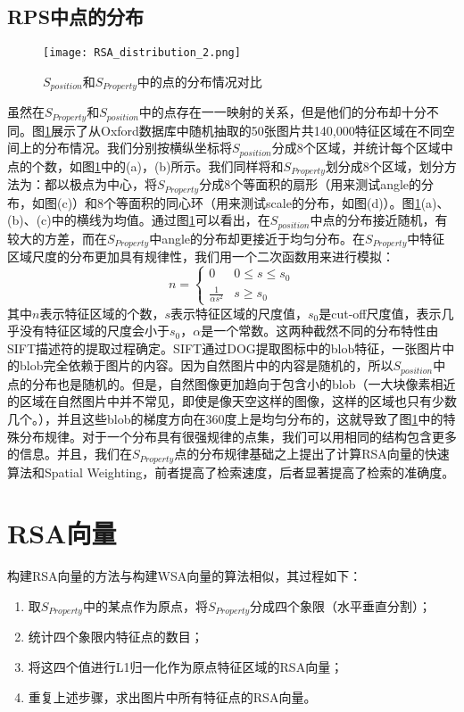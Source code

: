 \subsection{RPS中点的分布}
\begin{figure}[h]
	\centering
	\texttt{[image: RSA\_distribution\_2.png]}
	\caption{$S_{position}$和$S_{Property}$中的点的分布情况对比}\label{fig:RSA_dis_2}
\end{figure}
虽然在$S_{Property}$和$S_{position}$中的点存在一一映射的关系，但是他们的分布却十分不同。图\ref{fig:RSA_dis_2}展示了从Oxford\cite{philbin2007object}数据库中随机抽取的50张图片共140,000特征区域在不同空间上的分布情况。我们分别按横纵坐标将$S_{position}$分成8个区域，并统计每个区域中点的个数，如图\ref{fig:RSA_dis_2}中的(a)，(b)所示。我们同样将和$S_{Property}$划分成8个区域，划分方法为：都以极点为中心，将$S_{Property}$分成8个等面积的扇形（用来测试angle的分布，如图(c)）和8个等面积的同心环（用来测试scale的分布，如图(d)）。图\ref{fig:RSA_dis_2}(a)、(b)、(c)中的横线为均值。通过图\ref{fig:RSA_dis_2}可以看出，在$S_{position}$中点的分布接近随机，有较大的方差，而在$S_{Property}$中angle的分布却更接近于均匀分布。在$S_{Property}$中特征区域尺度的分布更加具有规律性，我们用一个二次函数用来进行模拟：
\begin{equation}\label{eq:scale}
n=
\begin{cases}
0 & \text{$0 \le s \le s_0$} \\
\frac{1}{\alpha s^2} & \text{$s \ge s_0$}
\end{cases}
\end{equation}
其中$n$表示特征区域的个数，$s$表示特征区域的尺度值，$s_0$是cut-off尺度值，表示几乎没有特征区域的尺度会小于$s_0$，$\alpha$是一个常数。这两种截然不同的分布特性由SIFT\cite{lowe2004distinctive}描述符的提取过程确定。SIFT通过DOG\cite{lowe2004distinctive}提取图标中的blob特征，一张图片中的blob完全依赖于图片的内容。因为自然图片中的内容是随机的，所以$S_{position}$中点的分布也是随机的。但是，自然图像更加趋向于包含小的blob（一大块像素相近的区域在自然图片中并不常见，即使是像天空这样的图像，这样的区域也只有少数几个。），并且这些blob的梯度方向在360度上是均匀分布的，这就导致了图\ref{fig:RSA_dis_2}中的特殊分布规律。对于一个分布具有很强规律的点集，我们可以用相同的结构包含更多的信息。并且，我们在$S_{Property}$点的分布规律基础之上提出了计算RSA向量的快速算法和Spatial Weighting，前者提高了检索速度，后者显著提高了检索的准确度。

\section{RSA向量}
构建RSA向量的方法与构建WSA\cite{penatti2014visual}向量的算法相似，其过程如下：
\begin{enumerate}
	\item 取$S_{Property}$中的某点作为原点，将$S_{Property}$分成四个象限（水平垂直分割）；
	\item 统计四个象限内特征点的数目；
	\item 将这四个值进行L1归一化作为原点特征区域的RSA向量；
	\item 重复上述步骤，求出图片中所有特征点的RSA向量。
\end{enumerate}

